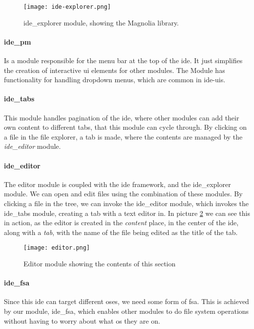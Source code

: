 \begin{figure}[H]
  \centering
  \texttt{[image: ide-explorer.png]}
  \caption{
    ide\_explorer module, showing the Magnolia library.
  }
  \label{pic:ideEx}
\end{figure}


\paragraph{ide\_pm} Is a module responsible for the menu bar at the top of the
\gls*{ide}. It just simplifies the creation of interactive \gls*{ui} elements
for other modules. The Module has functionality for handling dropdown menus,
which are common in \gls*{ide}-\gls*{ui}s.

\paragraph{ide\_tabs} This module handles pagination of the \gls*{ide}, where
other modules can add their own content to different tabs, that this module can
cycle through. By clicking on a file in the file explorer, a tab is made, where
the contents are managed by the \textit{ide\_editor} module.

\paragraph{ide\_editor} The editor module is coupled with the \gls*{ide}
framework, and the ide\_explorer module. We can open and edit files using the
combination of these modules. By clicking a file in the tree, we can invoke the
ide\_editor module, which invokes the ide\_tabs module, creating a tab with a
text editor in. In picture \ref{pic:editorModule} we can see this in action, as
the editor is created in the \textit{content} place, in the center of the
\gls*{ide}, along with a \textit{tab}, with the name of the file being edited as
the title of the tab.

\begin{figure}[H]
  \centering
  \texttt{[image: editor.png]}
  \caption{
    Editor module showing the contents of this section
  }
  \label{pic:editorModule}
\end{figure}

\paragraph{ide\_fsa} Since this \gls*{ide} can target different \gls*{os}es, we
need some form of \gls*{fsa}. This is achieved by our module, ide\_fsa, which
enables other modules to do file system operations without having to worry about
what \gls*{os} they are on.



